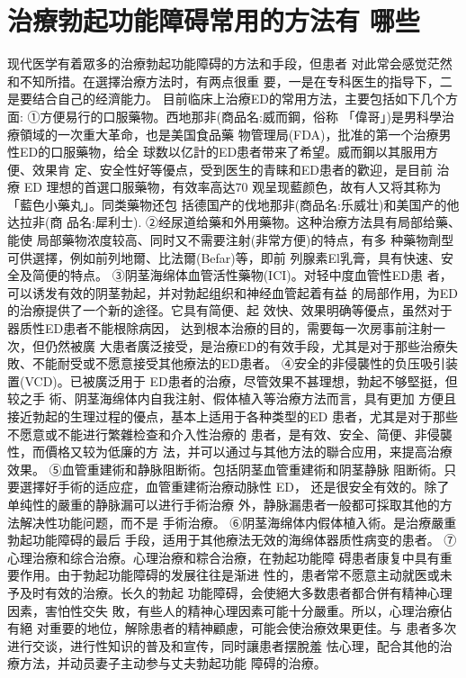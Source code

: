 \documentclass[12pt,UTF8]{ctexbook}
\begin{document}
\section{治療勃起功能障碍常用的方法有
哪些}
现代医学有着眾多的治療勃起功能障碍的方法和手段，但患者
对此常会感觉茫然和不知所措。在選擇治療方法时，有两点很重
要，一是在专科医生的指导下，二是要结合自己的经濟能力。
目前临床上治療ED的常用方法，主要包括如下几个方面:
①方便易行的口服藥物。西地那非(商品名:威而鋼，俗称
「偉哥」)是男科學治療領域的一次重大革命，也是美国食品藥
物管理局(FDA)，批准的第一个治療男性ED的口服藥物，给全
球数以亿計的ED患者带来了希望。威而鋼以其服用方便、效果肯
定、安全性好等優点，受到医生的青睐和ED患者的歡迎，是目前
治療 ED 理想的首選口服藥物，有效率高达70%
观呈现藍颜色，故有人又将其称为「藍色小藥丸」。同类藥物还包
括德国产的伐地那非(商品名:乐威壮)和美国产的他达拉非(商
品名:犀利士).
②经尿道给藥和外用藥物。这种治療方法具有局部给藥、能使
局部藥物浓度较高、同时又不需要注射(非常方便)的特点，有多
种藥物劑型可供選擇，例如前列地爾、比法爾(Befar)等，即前
列腺素El乳膏，具有快速、安全及简便的特点。
③阴茎海绵体血管活性藥物(ICI)。对轻中度血管性ED患
者，可以诱发有效的阴茎勃起，并对勃起组织和神经血管起着有益
的局部作用，为ED的治療提供了一个新的途径。它具有简便、起
效快、效果明确等優点，虽然对于器质性ED患者不能根除病因，
达到根本治療的目的，需要每一次房事前注射一次，但仍然被廣
大患者廣泛接受，是治療ED的有效手段，尤其是对于那些治療失
敗、不能耐受或不愿意接受其他療法的ED患者。
④安全的非侵襲性的负压吸引装置(VCD)。已被廣泛用于
ED患者的治療，尽管效果不甚理想，勃起不够堅挺，但较之手
術、阴茎海绵体内自我注射、假体植入等治療方法而言，具有更加
方便且接近勃起的生理过程的優点，基本上适用于各种类型的ED
患者，尤其是对于那些不愿意或不能进行繁雜检查和介入性治療的
患者，是有效、安全、简便、非侵襲性，而價格又较为低廉的方
法，并可以通过与其他方法的聯合应用，来提高治療效果。
⑤血管重建術和静脉阻断術。包括阴茎血管重建術和阴茎静脉
阻断術。只要選擇好手術的适应症，血管重建術治療动脉性 ED，
还是很安全有效的。除了单纯性的嚴重的静脉漏可以进行手術治療
外，静脉漏患者一般都可採取其他的方法解决性功能问题，而不是
手術治療。
⑥阴茎海绵体内假体植入術。是治療嚴重勃起功能障碍的最后
手段，适用于其他療法无效的海绵体器质性病变的患者。
⑦心理治療和综合治療。心理治療和粽合治療，在勃起功能障
碍患者康复中具有重要作用。由于勃起功能障碍的发展往往是渐进
性的，患者常不愿意主动就医或未予及时有效的治療。长久的勃起
功能障碍，会使絕大多数患者都合併有精神心理因素，害怕性交失
敗，有些人的精神心理因素可能十分嚴重。所以，心理治療佔有絕
对重要的地位，解除患者的精神顧慮，可能会使治療效果更佳。与
患者多次进行交谈，进行性知识的普及和宣传，同时讓患者摆脫羞
怯心理，配合其他的治療方法，并动员妻子主动参与丈夫勃起功能
障碍的治療。
\end{document}
